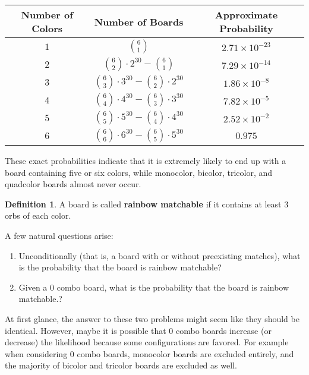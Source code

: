 \documentclass[12pt]{article}
\theoremstyle{definition}
\newtheorem{definition}{Definition}[section]
\begin{document}
\begin{center}
\renewcommand{\arraystretch}{2}
    \begin{tabular}{|c|c|c|}
        \hline
        Number of Colors & Number of Boards & Approximate Probability \\
        \hline\hline
        $1$ & $\binom{6}{1}$ & $%
        2.71\times 10^{-23}$ \\
        \hline
        $2$ & $\binom{6}{2}\cdot 2^{30}-\binom{6}{1}$ & $%
        7.29\times 10^{-14}$ \\
        \hline
        $3$ & $\binom{6}{3}\cdot 3^{30}-\binom{6}{2}\cdot 2^{30}$ & $%
        1.86\times 10^{-8}$ \\
        \hline
        $4$ & $\binom{6}{4}\cdot 4^{30}-\binom{6}{3}\cdot 3^{30}$ & $%
        7.82\times 10^{-5}$ \\
        \hline
        $5$ & $\binom{6}{5}\cdot 5^{30}-\binom{6}{4}\cdot 4^{30}$ & $%
        2.52\times 10^{-2}$ \\
        \hline
        $6$ & $\binom{6}{6}\cdot 6^{30}-\binom{6}{5}\cdot 5^{30}$ & $%
        0.975$ \\
        \hline
    \end{tabular}
\renewcommand{\arraystretch}{2}
\end{center}
These exact probabilities indicate that it is extremely likely to end up with a board containing five or six colors, while monocolor, bicolor, tricolor, and quadcolor boards almost never occur. 

\begin{definition}
    A board is called \textbf{rainbow matchable} if it contains at least 3 orbs of each color.
\end{definition}

A few natural questions arise:
\begin{enumerate}
    \item Unconditionally (that is, a board with or without preexisting matches), what is the probability that the board is rainbow matchable?
    \item Given a 0 combo board, what is the probability that the board is rainbow matchable.?
\end{enumerate}
At first glance, the answer to these two problems might seem like they should be identical. However, maybe it is possible that 0 combo boards increase (or decrease) the likelihood because some configurations are favored. For example when considering 0 combo boards, monocolor boards are excluded entirely, and the majority of bicolor and tricolor boards are excluded as well.
\end{document}
